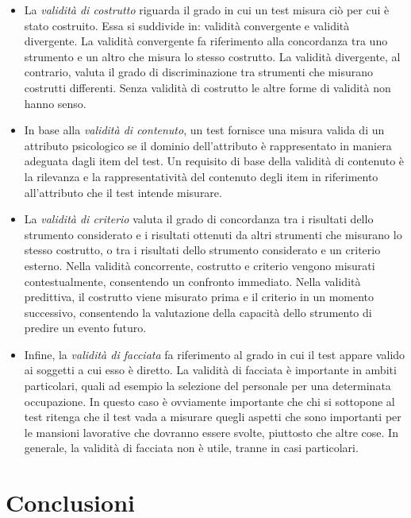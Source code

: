 \begin{itemize}
\item La \emph{validità di costrutto} riguarda il grado in cui un test misura ciò per cui è stato costruito.  
Essa si suddivide in: validità convergente e validità divergente. 
La validità convergente fa riferimento alla concordanza tra uno strumento e un altro che misura lo stesso costrutto. 
La validità divergente, al contrario, valuta il grado di discriminazione tra strumenti che misurano costrutti differenti. 
Senza validità di costrutto le  altre forme di validità non hanno senso. 

\item In base alla \emph{validità di contenuto}, un test fornisce una misura valida di un attributo psicologico se il dominio dell'attributo è rappresentato in maniera adeguata dagli item del test. 
Un requisito di base della validità di contenuto è  la rilevanza e la rappresentatività del contenuto degli item in  riferimento all'attributo che il test intende misurare. 

\item La \emph{validità di criterio} valuta il grado di concordanza tra i risultati dello strumento considerato e i risultati ottenuti da altri strumenti che misurano lo stesso costrutto, o tra i risultati dello strumento considerato e un criterio esterno. Nella validità concorrente, costrutto e criterio vengono misurati contestualmente, consentendo un confronto immediato. Nella validità predittiva, il costrutto viene misurato prima e il criterio in un momento successivo, consentendo la valutazione della capacità dello strumento di predire un evento futuro.

\item Infine, la \emph{validità di facciata} fa riferimento al grado in cui il test appare valido ai soggetti a cui esso è diretto. La validità di facciata è importante in ambiti particolari, quali ad esempio la selezione del personale per una determinata occupazione. In questo caso è ovviamente importante che chi si sottopone al test ritenga che il test vada a misurare quegli aspetti che sono importanti per le mansioni lavorative che dovranno essere svolte, piuttosto che altre cose. In generale, la validità di facciata non è utile, tranne in casi particolari.
\end{itemize}


\section*{Conclusioni}

